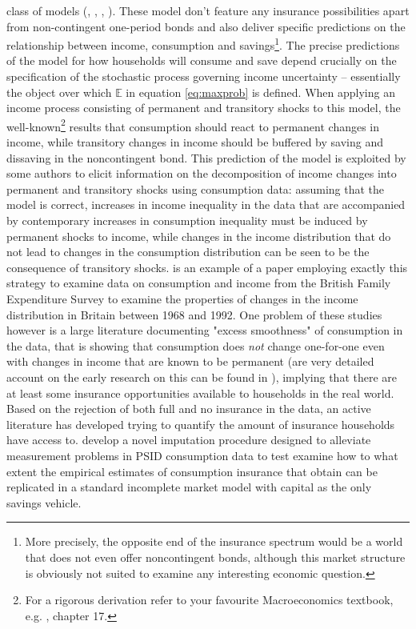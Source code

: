 class of models (\citet{Aiyagari1994}, \citet{Bewley1977}, \citet{Huggett1993},
\citet{Imrohoroglu1989}). These model don't feature any insurance possibilities
apart from non-contingent one-period bonds and also deliver specific predictions
on the relationship between income, consumption and savings\footnote{More precisely,
the opposite end of the insurance spectrum would be a world that does not even
offer noncontingent bonds, although this market structure is obviously not suited
to examine any interesting economic question.}. The precise predictions of the 
model for how households will consume and save depend crucially on the specification
of the stochastic process governing income uncertainty -- essentially the object
over which $\mathbb{E}$ in equation \ref{eq:maxprob} is defined. When applying an
income process consisting of permanent and transitory shocks to this model, the 
well-known\footnote{For a rigorous derivation refer to your favourite Macroeconomics
textbook, e.g. \citet{LjungqvistSargent2012}, chapter 17.} results that consumption
should react to permanent changes in income, while transitory changes in income
should be buffered by saving and dissaving in the noncontingent bond. This 
prediction of the model is exploited by some authors to elicit information on 
the decomposition of income changes into permanent and transitory shocks using 
consumption data: assuming that the model is correct, increases in income 
inequality in the data that are accompanied by contemporary increases in consumption
inequality must be induced by permanent shocks to income, while changes in the 
income distribution that do not lead to changes in the consumption distribution
can be seen to be the consequence of transitory shocks. \citet{BlundellPreston1998}
is an example of a paper employing exactly this strategy to examine data 
on consumption and income from the British Family Expenditure Survey to examine
the properties of changes in the income distribution in Britain between 1968 
and 1992. One problem of these studies however is a large literature documenting 
"excess smoothness" of consumption in the data, that is showing that consumption
does \textit{not} change one-for-one even with changes in income that are known
to be permanent (are very detailed account on the early research on this can be
found in \citealt{Deaton1992book}), implying that there are at least some 
insurance opportunities available to households in the real world. Based on the 
rejection of both full and no insurance in the data, an active literature has 
developed trying to quantify the amount of insurance households have access to.
\citet{KruegerPerri2004}
\citet{HeathcoteStoreslettenViolante2004}
\citet{HeathcoteStoreslettenViolante2007}
\citet{BlundellPistaferriPreston2008} develop a novel imputation procedure 
designed to alleviate measurement problems in PSID consumption data to test 
\citet{KaplanViolante2010} examine how to what extent the empirical estimates
of consumption insurance that \citet{BlundellPistaferriPreston2008} obtain can
be replicated in a standard incomplete market model with capital as the only 
savings vehicle. 




